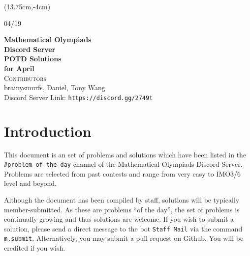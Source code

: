 \documentclass[10pt]{article}
\newcommand{\themonth}{April}
\newcommand{\theyear}{2019}
\newcommand{\theissue}{04/19}
\newcounter{day}
\newcounter{solution}
\begin{document}
	\begin{titlepage}
	\begin{textblock*}{2cm}(13.75cm,-4cm) \begin{flushright}\theissue \end{flushright} \end{textblock*}
		\begin{center}
			\LARGE\textbf{Mathematical Olympiads\\Discord Server}\\
			\Huge\textbf{POTD Solutions}\\
			\Large\textbf{for \themonth \space \theyear}\\
			\Large\textsc{Contributors}\\
			\normalsize{brainysmurfs, Daniel, Tony Wang}\\
			Discord Server Link: \texttt{https://discord.gg/2749t}\\
		\end{center}
	\end{titlepage}
	
		
	\tableofcontents
	\newpage

	\section{Introduction}
	
	This document is an set of problems and solutions which have been listed in the \texttt{\#problem-of-the-day} channel of the Mathematical Olympiads Discord Server. Problems are selected from past contests and range from very easy to IMO3/6 level and beyond.
	
	Although the document has been compiled by staff, solutions will be typically member-submitted. As these are problems ``of the day'', the set of problems is continually growing and thus solutions are welcome. If you wish to submit a solution, please send a direct message to the bot \texttt{Staff Mail} via the command \texttt{m.submit}. Alternatively, you may submit a pull request on Github. You will be credited if you wish.
	
\end{document}
